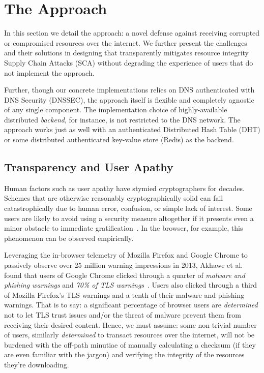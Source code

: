 \section{The \SYSTEM{} Approach} \label{sec:approach}

In this section we detail the \SYSTEM{} approach: a novel defense against
receiving corrupted or compromised resources over the internet. We further
present the challenges and their solutions in designing \SYSTEM{} that
transparently mitigates resource integrity Supply Chain Attacks (SCA) without
degrading the experience of users that do not implement the \SYSTEM{} approach.

Further, though our concrete implementations relies on DNS authenticated with
DNS Security (DNSSEC), the approach itself is flexible and completely agnostic
of any single component. The implementation choice of highly-available
distributed \emph{backend}, for instance, is not restricted to the DNS network.
The approach works just as well with an authenticated Distributed Hash Table
(DHT) or some distributed authenticated key-value store (\eg Redis) as the
backend.


\subsection{Transparency and User Apathy}

Human factors such as user apathy have stymied cryptographers for decades.
Schemes that are otherwise reasonably cryptographically solid can fail
catastrophically due to human error, confusion, or simple lack of interest. Some
users are likely to avoid using a security measure altogether if it presents
even a minor obstacle to immediate gratification~\cite{Clickthrough, PGPBad}. In
the browser, for example, this phenomenon can be observed empirically.

Leveraging the in-browser telemetry of Mozilla Firefox and Google Chrome to
passively observe over 25 million warning impressions in 2013, Akhawe et al.
found that users of Google Chrome clicked through a quarter of \emph{malware and
phishing warnings} and \emph{70\% of TLS warnings}~\cite{Clickthrough}. Users
also clicked through a third of Mozilla Firefox's TLS warnings and a tenth of
their malware and phishing warnings. That is to say: a significant percentage of
browser users are \emph{determined} not to let TLS trust issues and/or the
threat of malware prevent them from receiving their desired content. Hence, we
must assume: some non-trivial number of users, similarly \emph{determined} to
transact resources over the internet, will not be burdened with the off-path
minutiae of manually calculating a checksum (if they are even familiar with the
jargon) and verifying the integrity of the resources they're downloading.

